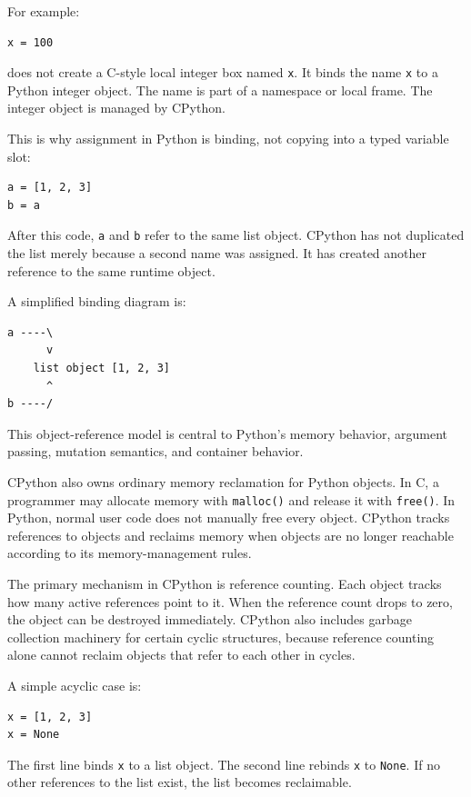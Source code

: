 For example:

\begin{verbatim}
x = 100
\end{verbatim}

does not create a C-style local integer box named \texttt{x}. It binds the name \texttt{x} to a Python integer object. The name is part of a namespace or local frame. The integer object is managed by CPython.

This is why assignment in Python is binding, not copying into a typed variable slot:

\begin{verbatim}
a = [1, 2, 3]
b = a
\end{verbatim}

After this code, \texttt{a} and \texttt{b} refer to the same list object. CPython has not duplicated the list merely because a second name was assigned. It has created another reference to the same runtime object.

A simplified binding diagram is:

\begin{verbatim}
a ----\
      v
    list object [1, 2, 3]
      ^
b ----/
\end{verbatim}

This object-reference model is central to Python's memory behavior, argument passing, mutation semantics, and container behavior.

CPython also owns ordinary memory reclamation for Python objects. In C, a programmer may allocate memory with \texttt{malloc()} and release it with \texttt{free()}. In Python, normal user code does not manually free every object. CPython tracks references to objects and reclaims memory when objects are no longer reachable according to its memory-management rules.

The primary mechanism in CPython is reference counting. Each object tracks how many active references point to it. When the reference count drops to zero, the object can be destroyed immediately. CPython also includes garbage collection machinery for certain cyclic structures, because reference counting alone cannot reclaim objects that refer to each other in cycles.

A simple acyclic case is:

\begin{verbatim}
x = [1, 2, 3]
x = None
\end{verbatim}

The first line binds \texttt{x} to a list object. The second line rebinds \texttt{x} to \texttt{None}. If no other references to the list exist, the list becomes reclaimable.

